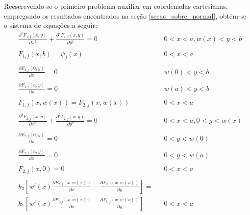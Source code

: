 Reescrevendo-se o primeiro problema auxiliar em coordenadas cartesianas, empregando os resultados encontrados na seção \ref{secao_sobre_normal}, obtém-se o sistema de equações a seguir:
\begin{subequations}
	\begin{alignat}{2}
	& \frac{\partial^2 F_{1,j}(x, y)}{\partial x^2} + \frac{\partial^2 F_{1,j}(x, y)}{\partial y^2} = 0  && 0 < x < a, w(x) < y < b \label{funcao_F_harm_T1_cart} \\ \nonumber \\
	& F_{1,j}(x, b) = \psi_j(x) && 0 < x < a  \label{funcao_F_cc_T1_2_cart} \\ \nonumber \\
	& \frac{\partial F_{1,j}(0, y)}{\partial x} = 0 && w(0) < y < b \label{funcao_F_cc_T1_1a_cart} \\ \nonumber \\
	& \frac{\partial F_{1,j}(a, y)}{\partial x} = 0 && w(a) < y < b \label{funcao_F_cc_T1_1b_cart} \\ \nonumber \\
	& F_{1,j}(x, w(x)) = F_{2, j}(x, w(x)) && 0 < x < a \label{funcao_F_cc_grad_T1_cart} \\ \nonumber \\
	& \frac{\partial^2 F_{2,j}(x, y)}{\partial x^2} + \frac{\partial^2 F_{2,j}(x, y)}{\partial y^2} = 0 &&  0 < x < a, 0 < y < w(x) \label{funcao_F_harm_T2_cart} \\ \nonumber \\
	& \frac{\partial F_{2,j}(0, y)}{\partial x} = 0 && 0 < y < w(0) \label{funcao_F_cc_T1_3a_cart} \\ \nonumber \\
	& \frac{\partial F_{2,j}(a, y)}{\partial x} = 0 && 0 < y < w(a) \label{funcao_F_cc_T1_3b_cart} \\ \nonumber \\
	& F_{2,j}(x, 0) = 0 && 0 < x < a \label{funcao_F_cc_T1_4_cart} \\ \nonumber \\
	& k_2\left[w'(x)\frac{\partial F_{2,j}(x, w(x))}{\partial x} - \frac{\partial F_{2,j}(x, w(x))}{\partial y}\right] = \nonumber \\
	& k_1\left[w'(x)\frac{\partial F_{1,j}(x, w(x))}{\partial x} - \frac{\partial F_{1,j}(x, w(x))}{\partial y}\right] && 0 < x < a \label{funcao_F_cc_T1_5_cart}
	\end{alignat}
\end{subequations}

